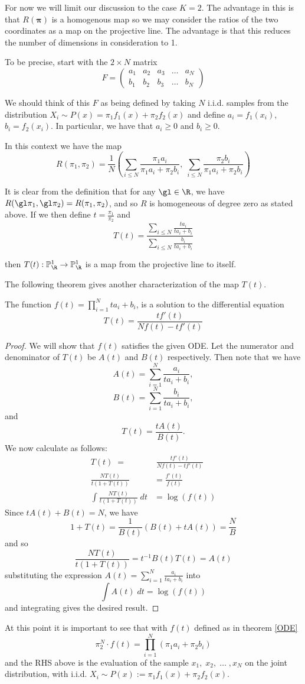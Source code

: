 For now we will limit our discussion to the case $K=2$.  The advantage in this is that $R(\bm\pi)$ is a homogenous map so we may consider the ratios of the two coordinates as a map on the projective line.  The advantage is that this reduces the number of dimensions in consideration to 1.

To be precise, start with the $2\times N$ matrix
\[F=
\begin{pmatrix}
a_1 & a_2 & a_3 & \ldots & a_N\\
b_1 & b_2 & b_3 & \ldots & b_N
\end{pmatrix}\]

We should think of this $F$ as being defined by taking $N$ i.i.d. samples from the distribution $X_i\sim P(x)=\pi_1 f_1(x)+\pi_2 f_2(x)$ and define $a_i=f_1(x_i)$, $b_i=f_2(x_i)$. In particular, we have that $a_i\geq 0$ and $b_i\geq 0$.

In this context we have the map 
\[R(\pi_1,\pi_2)=\frac 1N\left (\sum_{i\leq N}\frac{\pi_1a_i}{\pi_1a_i+\pi_2b_i},\; \sum_{i\leq N}\frac{\pi_2b_i}{\pi_1a_i+\pi_2b_i}\right )\] 

It is clear from the definition that for any $\gl\in\R$, we have $R(\gl\pi_1,\gl\pi_2)=R(\pi_1,\pi_2)$, and so $R$ is homogeneous of degree zero as stated above. If we then define $t=\frac{\pi_1}{\pi_2}$ and 
\[T(t)=\frac{\sum_{i\leq N}\frac{ta_i}{ta_i+b_i}}{\sum_{i\leq N}\frac{b_i}{ta_i+b_i}}\]

then $T(t):\mathbb{P}^1_{\R}\rightarrow\mathbb{P}^1_{\R}$ is a map from the projective line to itself.

The following theorem gives another characterization of the map $T(t)$.

\begin{thm}\label{ODE}
The function $f(t)=\prod_{i=1}^{N} ta_i+b_i$, is a solution to the differential equation \[T(t)=\frac{tf'(t)}{Nf(t)-tf'(t)}\]
\end{thm}

\begin{proof}
We will show that $f(t)$ satisfies the given ODE.  Let the numerator and denominator of $T(t)$ be $A(t)$ and $B(t)$ respectively.  Then note that we have \[A(t)=\sum_{i=1}^N \frac{a_i}{ta_i+b_i},\] \[B(t)=\sum_{i=1}^N \frac{b_i}{ta_i+b_i},\] and \[T(t)=\frac{tA(t)}{B(t)}.\]
We now calculate as follows:
\begin{align*}
T(t)\;=&\;\frac{tf'(t)}{Nf(t)-tf'(t)}\\
\frac{NT(t)}{t(1+T(t))}&=\frac{f'(t)}{f(t)}\\
\int\frac{NT(t)}{t(1+T(t))}\;dt&=\log(f(t))
\end{align*}
Since $tA(t)+B(t)=N$, we have 
\[1+T(t)=\frac{1}{B(t)}(B(t)+tA(t))=\frac{N}{B}\]
and so
\[\frac{NT(t)}{t(1+T(t))}=t^{-1}B(t)T(t)=A(t)\]
substituting the expression $A(t)=\sum_{i=1}^N \frac{a_i}{ta_i+b_i}$ into 
\[\int A(t)\;dt=\log(f(t))\]
and integrating gives the desired result.
\end{proof} 
At this point it is important to see that with $f(t)$ defined as in theorem \ref{ODE}
\[\pi_2^N\cdot f(t)=\prod_{i=1}^N (\pi_1a_i+\pi_2b_i)\]
and the RHS above is the evaluation of the sample $x_1,\;x_2,\;\ldots\;,x_N$ on the joint distribution, with  i.i.d. $X_i\sim P(x):=\pi_1 f_1(x)+\pi_2 f_2(x)$.

